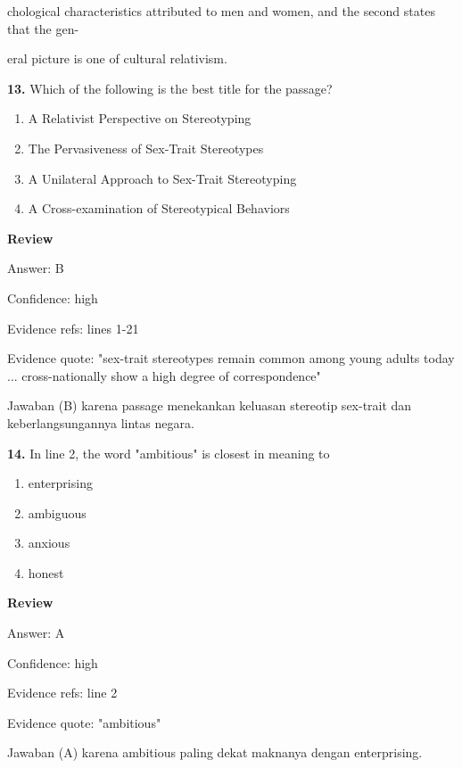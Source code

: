 \documentclass[12pt]{article}
\begin{document}
chological characteristics attributed to men and women, and the second states that the gen-\par
eral picture is one of cultural relativism.\par
\endgroup
\medskip
\noindent\textbf{13.} Which of the following is the best title for the passage?
\begin{enumerate}[label=(\Alph*),leftmargin=*,itemsep=0.2em]
\item A Relativist Perspective on Stereotyping
\item The Pervasiveness of Sex-Trait Stereotypes
\item A Unilateral Approach to Sex-Trait Stereotyping
\item A Cross-examination of Stereotypical Behaviors
\end{enumerate}
\par
\begingroup
\setlength{\parskip}{0pt}
\setlength{\parindent}{0pt}
\textbf{Review}\par
Answer: B\par
Confidence: high\par
Evidence refs: lines 1-21\par
Evidence quote: "sex-trait stereotypes remain common among young adults today ... cross-nationally show a high degree of correspondence"\par
Jawaban (B) karena passage menekankan keluasan stereotip sex-trait dan keberlangsungannya lintas negara.\par
\endgroup
\par
\vspace{0.25\baselineskip}
\noindent\textbf{14.} In line 2, the word "ambitious" is closest in meaning to
\begin{enumerate}[label=(\Alph*),leftmargin=*,itemsep=0.2em]
\item enterprising
\item ambiguous
\item anxious
\item honest
\end{enumerate}
\par
\begingroup
\setlength{\parskip}{0pt}
\setlength{\parindent}{0pt}
\textbf{Review}\par
Answer: A\par
Confidence: high\par
Evidence refs: line 2\par
Evidence quote: "ambitious"\par
Jawaban (A) karena ambitious paling dekat maknanya dengan enterprising.\par
\end{document}
